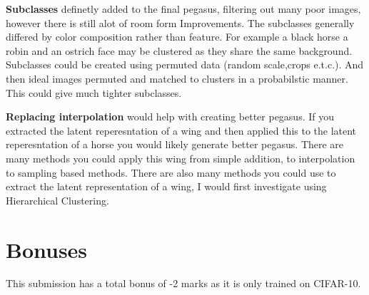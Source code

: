 \documentclass{article}
\begin{document}
\textbf{Subclasses} definetly added to the final pegasus, filtering out many poor images, however there is still alot of room form Improvements. The subclasses generally differed by color composition rather than feature. For example a black horse a robin and an ostrich face may be clustered as they share the same background. Subclasses could be created using permuted data (random scale,crops e.t.c.). And then ideal images permuted and matched to clusters in a probabilstic manner. This could give much tighter subclasses.

\textbf{Replacing interpolation} would help with creating better pegasus. If you extracted the latent reperesntation of a wing and then applied this to the latent reperesntation of a horse you would likely generate better pegasus. There are many methods you could apply this wing from simple addition, to interpolation to sampling based methods. There are also many methods you could use to extract the latent representation of a wing, I would first investigate using Hierarchical Clustering.


\section*{Bonuses}
This submission has a total bonus of -2 marks as it is only trained on CIFAR-10.

\printbibliography
\end{document}
